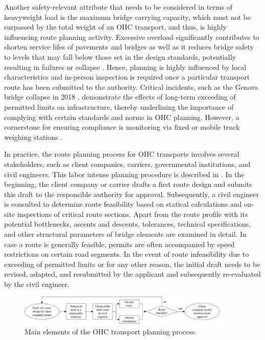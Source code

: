 Another safety-relevant attribute that needs to be considered in terms of heavyweight load is the maximum bridge carrying capacity, which must not be surpassed by the total weight of an OHC transport, and thus, is highly influencing route planning activity.
Excessive overload significantly contributes to shorten service lifes of pavements and bridges as well as it reduces bridge safety to levels that may fall below those set in the design standards, potentially resulting in failures or collapse \cite{fiorillo2018fragility, yan2018optimal, ghosn2000development}. Hence, planning is highly influenced by local characteristics and in-person inspection is required once a particular transport route has been submitted to the authority.
Critical incidents, such as the Genova bridge collapse in 2018 \cite{Morgese.2020, MorandiNYTimes},  demonstrate the effects of long-term exceeding of permitted limits on infrastructure, thereby underlining the importance of complying with certain standards and norms in OHC planning. However, a cornerstone for ensuring compliance is monitoring via fixed or mobile truck weighing stations \cite{fiorillo2016minimizing}.
\par In practice, the route planning process for OHC transports involves several stakeholders, such as client companies, carriers, governmental institutions, and civil engineers.
This labor intense planning procedure is described in \cite{Osegueda.1999}. In the beginning, the client company or carrier drafts a first route design and submits this draft to the responsible authority for approval.
Subsequently, a civil engineer is consulted to determine route feasibility based on statical calculations and on-site inspections of critical route sections. Apart from the route profile with its potential bottlenecks, ascents and descents, tolerances, technical specifications, and other structural parameters of bridge elements are examined in detail. In case a route is generally feasible, permits are often accompanied by speed restrictions on certain road segments. In the event of route infeasibility due to exceeding of permitted limits or for any other reason, the initial draft needs to be revised, adapted, and resubmitted by the applicant and subsequently re-evaluated by the civil engineer.

\begin{figure}[!ht]
  \centering
  \includegraphics[width=0.9\textwidth]{final.jpg}
  \caption{Main elements of the OHC transport planning process.}
  \label{fig:higher level}
\end{figure}

